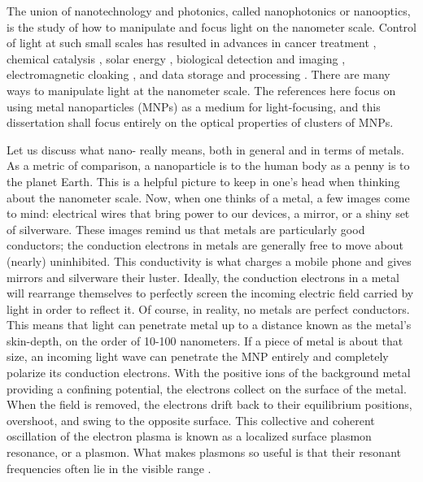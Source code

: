 \documentclass [11pt, proquest] {uwthesis}[2016/11/22]
\begin{document}
The union of nanotechnology and photonics, called nanophotonics or nanooptics, is the study of how to manipulate and focus light on the nanometer scale. Control of light at such small scales has resulted in advances in cancer treatment \cite{ElSayedCancer,LiuCancer}, chemical catalysis \cite{Halas2013,Camden2017}, solar energy \cite{Atwater2014,WuSolar}, biological detection and imaging \cite{vanDuyneSensing,Bezryadina2017}, electromagnetic cloaking \cite{AluCloaking,YeCloaking}, and data storage and processing \cite{MoloneyData,NaughtonData}. There are many ways to manipulate light at the nanometer scale. The references here focus on using metal nanoparticles (MNPs) as a medium for light-focusing, and this dissertation shall focus entirely on the optical properties of clusters of MNPs.

Let us discuss what nano- really means, both in general and in terms of metals. As a metric of comparison, a nanoparticle is to the human body as a penny is to the planet Earth. This is a helpful picture to keep in one's head when thinking about the nanometer scale. Now, when one thinks of a metal, a few images come to mind: electrical wires that bring power to our devices, a mirror, or a shiny set of silverware. These images remind us that metals are particularly good conductors; the conduction electrons in metals are generally free to move about (nearly) uninhibited. This conductivity is what charges a mobile phone and gives mirrors and silverware their luster. Ideally, the conduction electrons in a metal will rearrange themselves to perfectly screen the incoming electric field carried by light in order to reflect it. Of course, in reality, no metals are perfect conductors. This means that light can penetrate metal up to a distance known as the metal's skin-depth, on the order of 10-100 nanometers. If a piece of metal is about that size, an incoming light wave can penetrate the MNP entirely and completely polarize its conduction electrons. With the positive ions of the background metal providing a confining potential, the electrons collect on the surface of the metal. When the field is removed, the electrons drift back to their equilibrium positions, overshoot, and swing to the opposite surface. This collective and coherent oscillation of the electron plasma is known as a localized surface plasmon resonance, or a plasmon. What makes plasmons so useful is that their resonant frequencies often lie in the visible range \cite{KREIBIG1985}.
\end{document}
